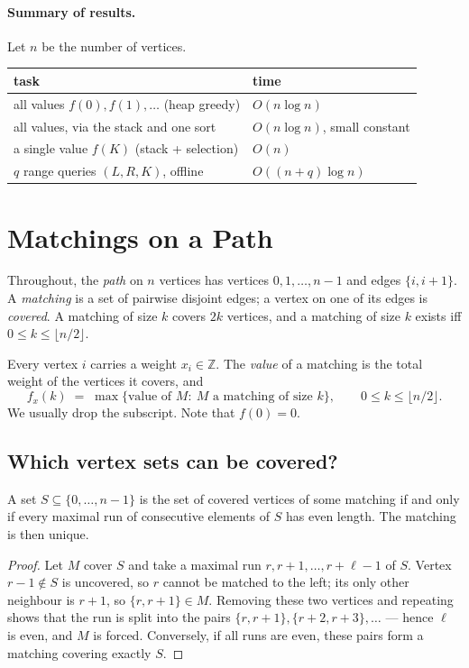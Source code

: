 \documentclass[11pt]{article}
\begin{document}
\paragraph{Summary of results.} Let $n$ be the number of vertices.
\begin{center}\small\sffamily
\begin{tabular}{@{}ll@{}}
\toprule
task & time\\
\midrule
all values $f(0),f(1),\dots$ (heap greedy) & $O(n\log n)$\\
all values, via the stack and one sort & $O(n\log n)$, small constant\\
a single value $f(K)$ (stack + selection) & $O(n)$\\
$q$ range queries $(L,R,K)$, offline & $O((n+q)\log n)$\\
\bottomrule
\end{tabular}
\end{center}

\section{Matchings on a Path}\label{sec:path}
Throughout, the \emph{path} on $n$ vertices has vertices $0,1,\dots,n-1$ and
edges $\{i,i+1\}$. A \emph{matching} is a set of pairwise disjoint edges;
a vertex on one of its edges is \emph{covered}. A matching of size $k$
covers $2k$ vertices, and a matching of size $k$ exists iff
$0\le k\le\lfloor n/2\rfloor$.

\begin{definitionbox}
Every vertex $i$ carries a weight $x_i\in\mathbb Z$. The \emph{value} of a
matching is the total weight of the vertices it covers, and
\[
  f_x(k)\;=\;\max\{\text{value of }M:\ M\text{ a matching of size }k\},
  \qquad 0\le k\le\lfloor n/2\rfloor .
\]
We usually drop the subscript. Note that $f(0)=0$.
\end{definitionbox}

\subsection{Which vertex sets can be covered?}
\begin{theorembox}
A set $S\subseteq\{0,\dots,n-1\}$ is the set of covered vertices of some
matching if and only if every maximal run of consecutive elements of $S$
has even length. The matching is then unique.
\end{theorembox}
\begin{proof}
Let $M$ cover $S$ and take a maximal run $r,r+1,\dots,r+\ell-1$ of $S$.
Vertex $r-1\notin S$ is uncovered, so $r$ cannot be matched to the left;
its only other neighbour is $r+1$, so $\{r,r+1\}\in M$. Removing these two
vertices and repeating shows that the run is split into the pairs
$\{r,r+1\},\{r+2,r+3\},\dots$ --- hence $\ell$ is even, and $M$ is forced.
Conversely, if all runs are even, these pairs form a matching covering
exactly $S$.
\end{proof}
\end{document}
